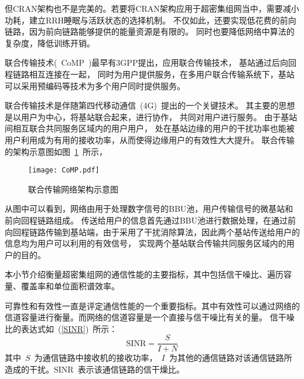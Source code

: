 但CRAN架构也不是完美的。若要将CRAN架构应用于超密集组网当中，需要减小功耗，建立RRH睡眠与活跃状态的选择机制。
不仅如此，还要实现低花费的前向链路，因为前向链路能够提供的能量资源是有限的。
同时也要降低网络中算法的复杂度，降低训练开销。


联合传输技术(~CoMP~)最早有3GPP提出，应用联合传输技术，
基站通过后向回程链路相互连接在一起，
同时为用户提供服务，在多用户联合传输系统下，基站可以采用预编码等技术为多个用户同时提供服务。

联合传输技术是伴随第四代移动通信~(4G)~提出的一个关键技术。
其主要的思想是以用户为中心，将基站联合起来，进行协作，
共同对用户进行服务。
由于基站间相互联合共同服务区域内的用户用户，
处在基站边缘的用户的干扰功率也能被用户利用成为有用的接收功率，从而使得边缘用户的有效性大大提升。
联合传输的架构示意图如图~\ref{CoMP}~所示，
\begin{figure}[htbp]
\centering
\texttt{[image: CoMP.pdf]}
\caption{联合传输网络架构示意图}\vspace{-0.5em}
\label{CoMP}
\end{figure}
从图中可以看到，网络由用于处理数字信号的BBU池，用户传输信号的微基站和前向回程链路组成。
传送给用户的信息首先通过BBU池进行数据处理，在通过前向回程链路传输到基站端，由于采用了干扰消除算法，因此两个基站传送给用户的信息均为用户可以利用的有效信号，
实现两个基站联合传输共同服务区域内的用户的目的。


本小节介绍衡量超密集组网的通信性能的主要指标，其中包括信干噪比、遍历容量、覆盖率和单位面积谱效率。


可靠性和有效性一直是评定通信性能的一个重要指标。其中有效性可以通过网络的信道容量进行衡量。而网络的信道容量是一个直接与信干噪比有关的量。
信干噪比的表达式如~(\ref{SINR})~所示：
\begin{equation}\label{SINR}
  \mathrm{SINR}=\frac{S}{I+N}
\end{equation}
其中~$S$~为通信链路中接收机的接收功率，~$I$~为其他的通信链路对该通信链路所造成的干扰。$\mathrm{SINR}$~表示该通信链路的信干燥比。

